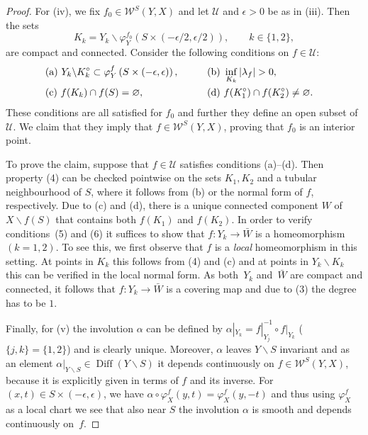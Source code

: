 \documentclass[pdftex]{sigma}
\numberwithin{equation}{section}
\theoremstyle{definition}
\newcommand{\1}{{\bf 1}}
\DeclareMathOperator{\Diff}{Diff}
\begin{document}
\begin{proof}
For (iv), we fix $f_0\in \mathcal W^S(Y,X)$ and let $\mathcal U$ and $\epsilon>0$ be as in (iii). Then the sets
\[
	K_k = Y_k \backslash \varphi_Y^{f_0}\left(S\times (-\epsilon/2,\epsilon/2)\right), \qquad k\in \{1,2\},
\]
are compact and connected. Consider the following conditions on $f\in \mathcal U$:
\begin{alignat*}{3}
&	{\rm(a)} \ Y_k\backslash K_k^\circ \subset \varphi_Y^f\left(S\times (-\epsilon,\epsilon)\right),\qquad && {\rm (b)} \  \inf_{K_k} |\lambda_f| > 0,&\\
&	{\rm (c)} \ f(K_k)\cap f(S)=\varnothing,\qquad &&{\rm (d)} \ f(K_1^\circ) \cap f(K_2^\circ) \neq \varnothing.&
\end{alignat*}
These conditions are all satisfied for $f_0$ and further they define an open subset of $\mathcal U$. We claim that they imply that $f\in \mathcal W^S(Y,X)$, proving that $f_0$ is an interior point.

To prove the claim, suppose that $f\in \mathcal U$ satisfies conditions (a)--(d). Then property (4) can be checked pointwise on the sets $K_1,K_2$ and a tubular neighbourhood of $S$, where it follows from (b) or the normal form of $f$, respectively.
Due to (c) and (d), there is a unique connected component $W$ of $X\backslash f(S)$ that contains both $f(K_1)$ and $f(K_2)$. In order to verify conditions~(5) and (6) it suffices to show that
$f\colon Y_k \to \bar W$ is a homeomorphism $(k=1,2)$.
To see this, we first observe that $f$ is a {\it local} homeomorphism in this setting. At points in $K_k$ this follows from (4) and (c) and at points in $Y_k\backslash K_k$ this can be verified in the local normal form. As both~$Y_k$ and~$\bar W$ are compact and connected, it follows that $f\colon Y_k\to \bar W$ is a covering map and due to (3) the degree has to be $1$.

Finally, for (v) the involution $\alpha$ can be defined by $\alpha|_{Y_{k}} = f|_{Y_{j}}^{-1}\circ f|_{Y_k}$ ($\{j,k\} =\{1,2\}$) and is clearly unique. Moreover, $\alpha$ leaves $Y\backslash S$ invariant and as an element $\alpha|_{Y\backslash S} \in \Diff(Y\backslash S)$ it depends continuously on $f\in \mathcal W^S(Y,X)$, because it is explicitly given in terms of $f$ and its inverse. For $(x,t)\in S\times (-\epsilon,\epsilon)$, we have $\alpha\circ\varphi_X^f(y,t) = \varphi_X^f(y,-t)$ and thus using $\varphi_X^f$ as a local chart we see that also near $S$ the involution $\alpha$ is smooth and depends continuously on~$f$.
\end{proof}
\end{document}
